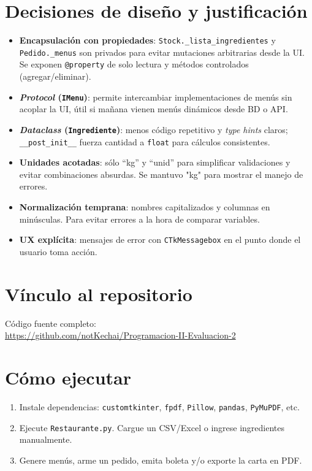 \documentclass[12pt,a4paper]{article}
\newcommand{\codehl}[1]{\colorbox{yellow!30}{\texttt{#1}}}
\begin{document}
\section{Decisiones de diseño y justificación}
\begin{itemize}[leftmargin=*]
  \item \textbf{Encapsulación con propiedades}: \codehl{Stock.\_lista\_ingredientes} y \codehl{Pedido.\_menus} son privados para evitar mutaciones arbitrarias desde la UI. Se exponen \texttt{@property} de solo lectura y métodos controlados (agregar/eliminar).
  \item \textbf{\textit{Protocol} (\texttt{IMenu})}: permite intercambiar implementaciones de menús sin acoplar la UI, útil si mañana vienen menús dinámicos desde BD o API.
  \item \textbf{\textit{Dataclass} (\texttt{Ingrediente})}: menos código repetitivo y \textit{type hints} claros; \texttt{\_\_post\_init\_\_} fuerza cantidad a \texttt{float} para cálculos consistentes.
  \item \textbf{Unidades acotadas}: sólo “kg” y “unid” para simplificar validaciones y evitar combinaciones absurdas. Se mantuvo "kg" para mostrar el manejo de errores.
  \item \textbf{Normalización temprana}: nombres capitalizados y columnas en minúsculas. Para evitar errores a la hora de comparar variables.
  \item \textbf{UX explícita}: mensajes de error con \texttt{CTkMessagebox} en el punto donde el usuario toma acción.
\end{itemize}
\newpage

\section{Vínculo al repositorio}
Código fuente completo: \\ \href{https://github.com/notKechai/Programacion-II-Evaluacion-2}{https://github.com/notKechai/Programacion-II-Evaluacion-2}


\section{Cómo ejecutar}
\begin{enumerate}[leftmargin=*]
  \item Instale dependencias: \texttt{customtkinter}, \texttt{fpdf}, \texttt{Pillow}, \texttt{pandas}, \texttt{PyMuPDF}, etc.
  \item Ejecute \texttt{Restaurante.py}. Cargue un CSV/Excel o ingrese ingredientes manualmente.
  \item Genere menús, arme un pedido, emita boleta y/o exporte la carta en PDF.
\end{enumerate}
\end{document}
